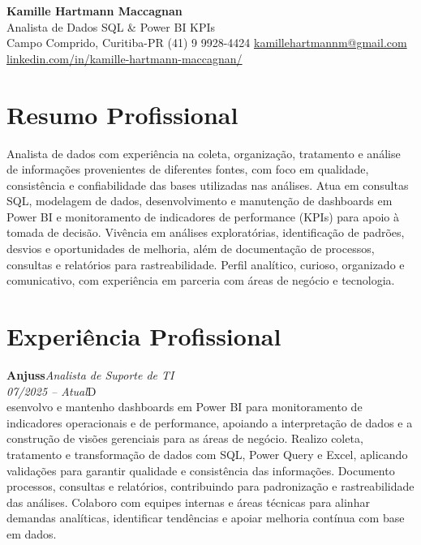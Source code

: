 \documentclass[11pt,a4paper]{article}
\newcommand{\cvrole}[4]{%
  \vspace{4pt}%
  {\bfseries\color{accentcolor}#1}\hfill{\itshape #2}\\[-2pt]%
  {\itshape #3}\hfill #4\\[6pt]%
}
\begin{document}
\begin{center}
  {\fontsize{20}{24}\selectfont\bfseries Kamille Hartmann Maccagnan}\\[8pt]
  {\large Analista de Dados \textbar{} SQL \& Power BI \textbar{} KPIs}\\[10pt]
  Campo Comprido, Curitiba-PR \enspace\textbullet\enspace (41) 9 9928-4424 \enspace\textbullet\enspace
  \href{mailto:kamillehartmannm@gmail.com}{kamillehartmannm@gmail.com}\\[3pt]
  \href{https://linkedin.com/in/kamille-hartmann-maccagnan/}{linkedin.com/in/kamille-hartmann-maccagnan/}
\end{center}

\vspace{6pt}

\section{Resumo Profissional}

Analista de dados com experiência na coleta, organização, tratamento e análise de informações provenientes de diferentes fontes, com foco em qualidade, consistência e confiabilidade das bases utilizadas nas análises. Atua em consultas SQL, modelagem de dados, desenvolvimento e manutenção de dashboards em Power BI e monitoramento de indicadores de performance (KPIs) para apoio à tomada de decisão. Vivência em análises exploratórias, identificação de padrões, desvios e oportunidades de melhoria, além de documentação de processos, consultas e relatórios para rastreabilidade. Perfil analítico, curioso, organizado e comunicativo, com experiência em parceria com áreas de negócio e tecnologia.

\section{Experiência Profissional}

\cvrole{Anjuss}{Analista de Suporte de TI}{07/2025 -- Atual}

Desenvolvo e mantenho dashboards em Power BI para monitoramento de indicadores operacionais e de performance, apoiando a interpretação de dados e a construção de visões gerenciais para as áreas de negócio. Realizo coleta, tratamento e transformação de dados com SQL, Power Query e Excel, aplicando validações para garantir qualidade e consistência das informações. Documento processos, consultas e relatórios, contribuindo para padronização e rastreabilidade das análises. Colaboro com equipes internas e áreas técnicas para alinhar demandas analíticas, identificar tendências e apoiar melhoria contínua com base em dados.
\end{document}
